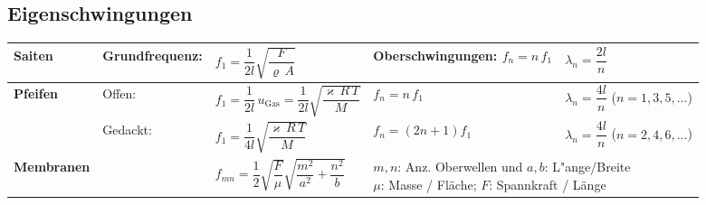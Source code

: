 \subsection{Eigenschwingungen  }
\renewcommand{\arraystretch}{2.7}
\begin{tabular}{|l|llll|}
\hline
\textbf{Saiten}
	& Grundfrequenz: 
	& $ f_1=\dfrac{1}{2l}\sqrt{\dfrac{F}{\varrho\,A}}$
	& Oberschwingungen: $ f_n=n\, f_1$
	& $\lambda_n=\dfrac{2l}{n}$\\
\hline
\textbf{Pfeifen} & Offen:
 	& $f_1=\dfrac{1}{2l}\,u_{\text{Gas}}=\dfrac{1}{2l}\sqrt{\dfrac{\varkappa\,R\,T}{M}}$ 
	& $f_n=n\, f_1$
	& $\lambda_n=\dfrac{4l}{n}$ \quad ($n=1,3,5,...$) \\
& Gedackt: 
 	& $ f_1=\dfrac{1}{4l}\sqrt{\dfrac{\varkappa\,R\,T}{M}}$
	& $f_n=(2n+1) f_1$
	& $\lambda_n=\dfrac{4l}{n}$ \quad ($n=2,4,6,...$) \\ 
\hline
\textbf{Membranen}
 	& &
 	$f_{mn}=\dfrac{1}{2}\sqrt{\dfrac{F}{\mu}}\sqrt{\dfrac{m^2}{a^2}+\dfrac{n^2}{b}}$ 
	& \multicolumn{2}{l|}{\parbox{8cm}{$m,n$: Anz. Oberwellen und $a,b$:
	L"ange/Breite \\
	$\mu$: Masse / Fläche; $F$: Spannkraft / Länge}} \\ \hline
\end{tabular}

